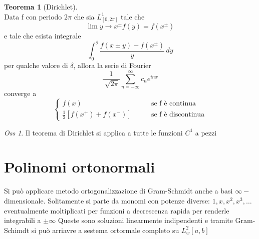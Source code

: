 \documentclass[a4paper,11pt]{report}
\theoremstyle{remark}
\newtheorem*{oss}{Oss}
\theoremstyle{definition}
\newtheorem*{teo}{Teorema}
\begin{document}
\begin{teo}[Dirichlet]\hfill\\
	Data f con periodo $2\pi$  che sia $L^1_{[0,2\pi]}$ tale che 
	\begin{equation*}
		\lim{y\to x^{\pm}} f(y) = f(x^{\pm})	
	\end{equation*}
	e tale che esista integrale 
	\begin{equation*}
		\int_0^\delta \frac{f(x\pm y)-f(x^{\pm})}{y} \, dy
	\end{equation*}	
	per qualche valore di $\delta$, allora la serie di Fourier 
	\begin{equation*}
		\frac{1}{\sqrt[]{2\pi}} \sum_{n=-\infty}^\infty c_n e^{inx}
	\end{equation*}
	converge a 
	\begin{equation*}
		\begin{cases}
			f(x) \qquad &\text{se f è continua}\\
			\frac{1}{2}[f(x^+)+f(x^-)] \qquad & \text{se f è discontinua}
		\end{cases}
	\end{equation*}
\end{teo}

\begin{oss}
	Il teorema di Dirichlet si applica a tutte le funzioni $C^1$ a pezzi 
\end{oss}

\section{Polinomi ortonormali}

Si può applicare metodo ortogonalizzazione di Gram-Schmidt anche a basi $\infty-$dimensionale. \newline
Solitamente si parte da monomi con potenze diverse: $1,x,x^2,x^3,\dots$ eventualmente moltiplicati per funzioni a decrescenza rapida per renderle integrabili a $\pm\infty$ \newline
Queste sono soluzioni linearmente indipendenti e tramite Gram-Schimdt si può arriavre a sestema ortormale completo su $L^2_w [a,b]$
\end{document}
